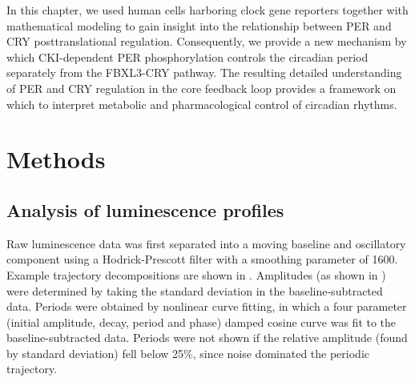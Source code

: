 In this chapter, we used human cells harboring clock gene reporters together with mathematical modeling to gain insight into the relationship between PER and CRY posttranslational regulation. 
Consequently, we provide a new mechanism by which CKI-dependent PER phosphorylation controls the circadian period separately from the FBXL3-CRY pathway. 
The resulting detailed understanding of PER and CRY regulation in the core feedback loop provides a framework on which to interpret metabolic and pharmacological control of circadian rhythms.

\section{Methods}
\subsection{Analysis of luminescence profiles}
Raw luminescence data was first separated into a moving baseline and oscillatory component using a Hodrick-Prescott filter with a smoothing parameter of 1600. 
Example trajectory decompositions are shown in . 
Amplitudes (as shown in ) were determined by taking the standard deviation in the baseline-subtracted data. 
Periods were obtained by nonlinear curve fitting, in which a four parameter (initial amplitude, decay, period and phase) damped cosine curve was fit to the baseline-subtracted data. 
Periods were not shown if the relative amplitude (found by standard deviation) fell below 25\%, since noise dominated the periodic trajectory. 

